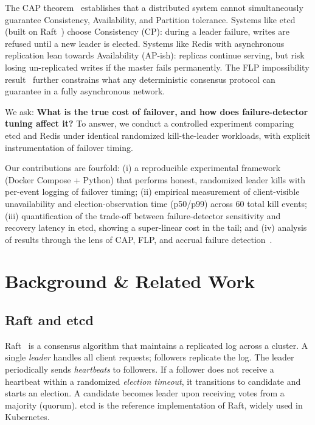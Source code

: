 \documentclass[conference]{IEEEtran}
\begin{document}
The CAP theorem~\cite{gilbert2002brewer} establishes that a distributed system cannot simultaneously guarantee Consistency, Availability, and Partition tolerance. Systems like etcd (built on Raft~\cite{ongaro2014search}) choose Consistency (CP): during a leader failure, writes are refused until a new leader is elected. Systems like Redis with asynchronous replication lean towards Availability (AP-ish): replicas continue serving, but risk losing un-replicated writes if the master fails permanently. The FLP impossibility result~\cite{fischer1985impossibility} further constrains what any deterministic consensus protocol can guarantee in a fully asynchronous network.

We ask: \textbf{What is the true cost of failover, and how does failure-detector tuning affect it?} To answer, we conduct a controlled experiment comparing etcd and Redis under identical randomized kill-the-leader workloads, with explicit instrumentation of failover timing.

Our contributions are fourfold: (i) a reproducible experimental framework (Docker Compose + Python) that performs honest, randomized leader kills with per-event logging of failover timing; (ii) empirical measurement of client-visible unavailability and election-observation time (p50/p99) across 60 total kill events; (iii) quantification of the trade-off between failure-detector sensitivity and recovery latency in etcd, showing a super-linear cost in the tail; and (iv) analysis of results through the lens of CAP, FLP, and accrual failure detection~\cite{hayashibara2004phi}.

\section{Background \& Related Work}

\subsection{Raft and etcd}
Raft~\cite{ongaro2014search} is a consensus algorithm that maintains a replicated log across a cluster. A single \textit{leader} handles all client requests; followers replicate the log. The leader periodically sends \textit{heartbeats} to followers. If a follower does not receive a heartbeat within a randomized \textit{election timeout}, it transitions to candidate and starts an election. A candidate becomes leader upon receiving votes from a majority (quorum). etcd is the reference implementation of Raft, widely used in Kubernetes.
\end{document}
